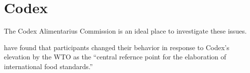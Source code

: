 
\section{Codex}

The Codex Alimentarius Commission is an ideal place to investigate these issues. 



\citet{veggeland:2005} have found that participants changed their behavior in response to Codex's elevation by the WTO as the ``central refernce point for the elaboration of international food standards.''


